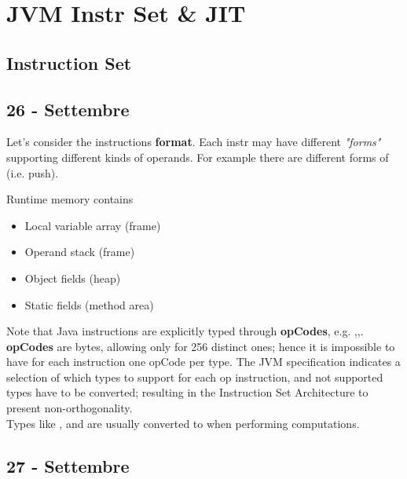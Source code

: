\chapter{JVM Instr Set \& JIT}
\section{Instruction Set}
\section*{26 - Settembre}


Let's consider the instructions \textbf{format}.
Each instr may have different \textit{"forms"} supporting different kinds of operands.
For example there are different forms of  (i.e. push).

Runtime memory contains
\begin{itemize}
	\item Local variable array (frame)
	\item Operand stack (frame)
	\item Object fields (heap)
	\item Static fields (method area)
\end{itemize}

Note that Java instructions are explicitly typed through \textbf{opCodes}, e.g. ,,.\\
\textbf{opCodes} are bytes, allowing only for 256 distinct ones;
hence it is impossible to have for each instruction one opCode per type.
The JVM specification indicates a selection of which types to support for each op instruction, and not supported types have to be converted; resulting in the Instruction Set Architecture to present non-orthogonality.\\
Types like ,  and  are usually converted to  when performing computations.

\section*{27 - Settembre}

